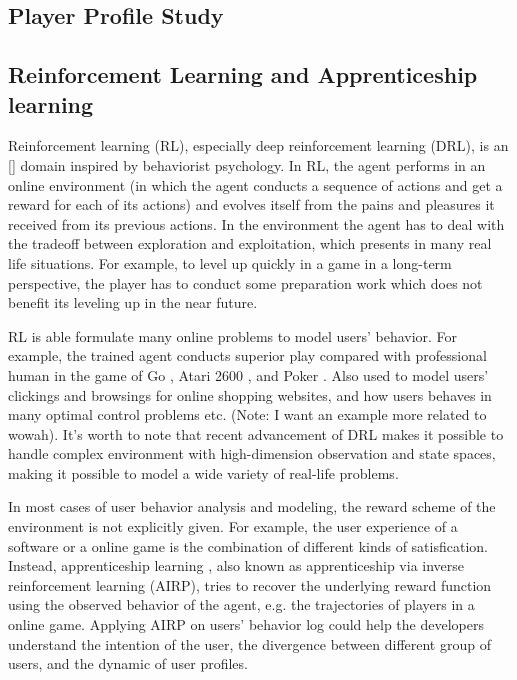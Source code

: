 \documentclass[a4paper]{article}
\begin{document}
\subsection{Player Profile Study}



\subsection{Reinforcement Learning and Apprenticeship learning}

Reinforcement learning (RL), especially deep reinforcement learning (DRL), is an [] domain  inspired by behaviorist psychology. In RL, the agent performs in an online environment (in which the agent conducts a sequence of actions and get a reward for each of its actions) and evolves itself from the pains and pleasures it received from its previous actions. In the environment the agent has to deal with the tradeoff between exploration and exploitation, which presents in many real life situations. For example, to level up quickly in a game in a long-term perspective, the player has to conduct some preparation work which does not benefit its leveling up in the near future.

RL is able formulate many online problems to model users' behavior. For example, the trained agent conducts superior play compared with professional human in the game of Go \cite{}, Atari 2600 \cite{}, and Poker \cite{}. Also used to model users' clickings and browsings for online shopping websites, and how users behaves in many optimal control problems etc. (Note: I want an example more related to wowah). It's worth to note that recent advancement of DRL makes it possible to handle complex environment with high-dimension observation and state spaces, making it possible to model a wide variety of real-life problems.

In most cases of user behavior analysis and modeling, the reward scheme of the environment is not explicitly given. For example, the user experience of a software or a online game is the combination of different kinds of satisfication. Instead, apprenticeship learning \cite{}, also known as apprenticeship via inverse reinforcement learning (AIRP), tries to recover the underlying reward function using the observed behavior of the agent, e.g. the trajectories of players in a online game. Applying AIRP on users' behavior log could help the developers understand the intention of the user, the divergence between different group of users, and the dynamic of user profiles. 
\end{document}
